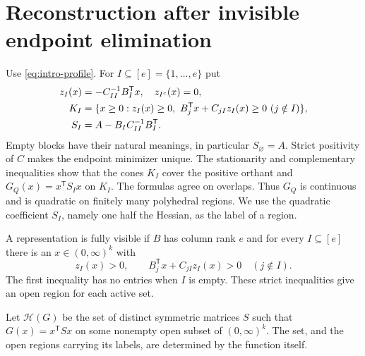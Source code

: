 \section{Reconstruction after invisible endpoint elimination}\label{sec:endpoints}
Use \eqref{eq:intro-profile}. For $I\subseteq[e]=\{1,\ldots,e\}$ put
\begin{align}\label{eq:active-data}
 z_I(x)&=-C_{II}^{-1}B_I^{\mathsf T}x,\quad z_{I^c}(x)=0,\notag\\
 K_I&=\{x\ge0:z_I(x)\ge0,\ B_j^{\mathsf T}x+C_{jI}z_I(x)\ge0\ (j\notin I)\},\\
 S_I&=A-B_IC_{II}^{-1}B_I^{\mathsf T}.\notag
\end{align}
Empty blocks have their natural meanings, in particular $S_\varnothing=A$.
Strict positivity of $C$ makes the endpoint minimizer unique. The stationarity and complementary inequalities show that the cones $K_I$ cover the positive orthant and
$G_Q(x)=x^{\mathsf T}S_Ix$ on $K_I$. The formulas agree on overlaps. Thus $G_Q$ is continuous and is quadratic on finitely many polyhedral regions. We use the quadratic coefficient $S_I$, namely one half the Hessian, as the label of a region.

\begin{definition}\label{def:visible}
A representation is fully visible if $B$ has column rank $e$ and for every $I\subseteq[e]$ there is an $x\in(0,\infty)^k$ with
\[
 z_I(x)>0,\qquad B_j^{\mathsf T}x+C_{jI}z_I(x)>0\quad(j\notin I).
\]
The first inequality has no entries when $I$ is empty. These strict inequalities give an open region for each active set.
\end{definition}
Let $\mathcal H(G)$ be the set of distinct symmetric matrices $S$ such that $G(x)=x^{\mathsf T}Sx$ on some nonempty open subset of $(0,\infty)^k$. The set, and the open regions carrying its labels, are determined by the function itself.

